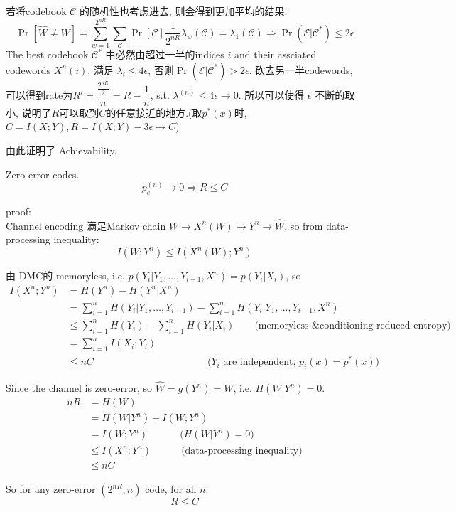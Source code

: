 若将codebook $\mathcal{C}$ 的随机性也考虑进去, 则会得到更加平均的结果:
$$\Pr\left[\hat{W}\neq W\right]=\sum_{w=1}^{2^{nR}}\sum_{\mathcal{C}}\Pr[\mathcal{C}]\dfrac{1}{2^{nR}}\lambda_w(\mathcal{C})=\lambda_1(\mathcal{C})\Rightarrow \Pr(\mathcal{E}|\mathcal{C}^*)\leq 2\epsilon$$
The best codebook $\mathcal{C}^*$ 中必然由超过一半的indices $i$ and their assciated codewords $X^n(i)$, 满足 $\lambda_i\leq 4\epsilon$, 否则$\Pr(\mathcal{E}|\mathcal{C}^*)>2\epsilon$. 砍去另一半codewords, 可以得到rate为$R'=\dfrac{\frac{2^{nR}}{2}}{n}=R-\dfrac{1}{n}$, s.t. $\lambda^{(n)}\leq 4\epsilon\to 0$. 所以可以使得 $\epsilon$ 不断的取小, 说明了$R$可以取到$C$的任意接近的地方.(取$p^*(x)$时, $C=I(X;Y), R=I(X;Y)-3\epsilon\to C$)

由此证明了 Achievability.

\begin{proposition}
Zero-error codes.
$$p_e^{(n)}\to 0 \Rightarrow R\leq C$$
\end{proposition}
proof: \\
Channel encoding 满足Markov chain $W\to X^n(W)\to Y^n\to \hat{W}$, so from data-processing inequality:
$$I(W; Y^n)\leq I(X^n(W); Y^n)$$

由 DMC的 memoryless, i.e. $p(Y_i|Y_1,\ldots,Y_{i-1},X^n)=p(Y_i|X_i)$, so
\begin{align*}
I(X^n;Y^n) &= H(Y^n) - H(Y^n|X^n) \\
&= \sum_{i=1}^nH(Y_i|Y_1,\ldots,Y_{i-1}) - \sum_{i=1}^nH(Y_i|Y_1,\ldots,Y_{i-1}, X^n) \\
&\leq \sum_{i=1}^nH(Y_i) - \sum_{i=1}^nH(Y_i|X_i) \qquad \text{(memoryless \& conditioning reduced entropy)} \\
&= \sum_{i=1}^n I(X_i;Y_i) \\
&\leq nC \qquad\qquad\qquad\qquad\qquad\quad\ \ \text{($Y_i$ are independent, $p_i(x)=p^*(x)$)}
\end{align*}

Since the channel is zero-error, so $\hat{W}=g(Y^n)=W$, i.e. $H(W|Y^n)=0$.
\begin{align*}
nR &= H(W) \\
&= H(W|Y^n) + I(W;Y^n) \\
&= I(W;Y^n) \qquad\quad\ \text{($H(W|Y^n)=0$)} \\
&\leq I(X^n;Y^n) \qquad\quad \text{(data-processing inequality)} \\
&\leq nC
\end{align*}

So for any zero-error $\left(2^{nR}, n\right)$ code, for all $n$:
$$R\leq C$$

